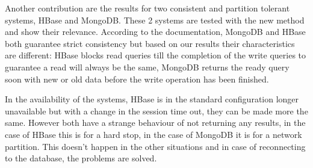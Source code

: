 \documentclass[final,5p,times]{elsarticle}
\begin{document}
Another contribution are the results for two consistent and partition tolerant systems, HBase and MongoDB. These 2 systems are tested with the new method and show their relevance. According to the documentation, MongoDB and HBase both guarantee strict consistency but based on our results their characteristics are different: HBase blocks read queries till the completion of the write queries to guarantee a read will always be the same, MongoDB returns the ready query soon with new or old data before the write operation has been finished. 

In the availability of the systems, HBase is in the standard configuration longer unavailable but with a change in the session time out, they can be made more the same. However both have a strange behaviour of not returning any results, in the case of HBase this is for a hard stop, in the case of MongoDB it is for a network partition. This doesn't happen in the other situations and in case of reconnecting to the database, the problems are solved. 











\end{document}

